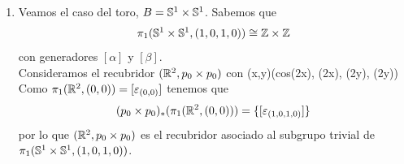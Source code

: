 \begin{ejemplo}
\begin{enumerate}
        Buscamos ahora los recubridores cuyo subgrupo asociado es $H_k$.  Con la misma idea que en el ejemplo anterior definimos la función $p_k$ para $k\in \bb{Z}^+$ dada por 
             {(\cos(\theta), \sen(\theta), y)}{(\cos(k\theta), \sen(k\theta), y)}
        Al igual que en el ejemplo anterior tenemos que 
        \begin{gather*}
            p_{k*}([\alpha]) = [\alpha]^k\\
            p_{k*}(\pi_1(\bb{S}^1 \times \bb{R}, (1,0,0))) = \{[\alpha]^{kn} : n\in \bb{Z}\} = H_k
        \end{gather*}
        Por tanto los únicos recubridores del cilindro $\bb{S}^1\times \bb{R}$ son 
        \begin{gather*}
            (\bb{R}^2, p_0) \text{ con } p_0(x,y) = (\cos(2\pi x), \sen(2\pi x), y)\\
            (\bb{S}^1\times \bb{R}, p_k) \text{ con } p_k(\cos(\theta), \sen(\theta), y) = (\cos(k\theta), \sen(k\theta), y) \text{ para todo } k\in \bb{Z}^+
        \end{gather*}

        \item Veamos el caso del toro, $B=\mathbb{S}^1 \times \mathbb{S}^1$. Sabemos que 
        \begin{gather*}
            \pi_1(\mathbb{S}^1\times \mathbb{S}^1, (1,0,1,0)) \cong \mathbb{Z}\times \mathbb{Z}
        \end{gather*}
        con generadores $[\alpha]$ y $[\beta]$.\\

        Consideramos el recubridor $(\mathbb{R}^2, p_0\times p_0)$ con 
             {(x,y)}{(cos(2\pi x), \sen(2\pi x), \cos(2\pi y), \sen(2\pi y))}
        Como $\pi_1(\mathbb{R}^2, (0,0)) = [\varepsilon_{(0,0)}]$ tenemos que 
        \begin{gather*}
            (p_0\times p_0)_*(\pi_1(\mathbb{R}^2, (0,0))) = \{[\varepsilon_{(1,0,1,0)}]\}
        \end{gather*}
        por lo que $(\mathbb{R}^2, p_0\times p_0)$ es el recubridor asociado al subgrupo trivial de $\pi_1(\mathbb{S}^1\times \mathbb{S}^1, (1,0,1,0))$.\\


\end{enumerate}
\end{ejemplo}
